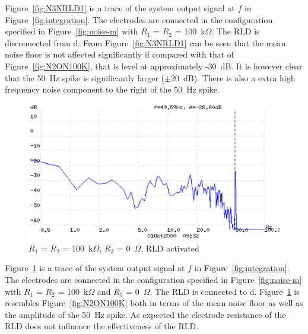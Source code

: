 Figure~\ref{fig:N3NRLD1} is a trace of the system output signal at $f$
in Figure~\ref{fig:integration}. The electrodes are connected in the
configuration specified in Figure~\ref{fig:noise-m} with $R_1$ = $R_2$
= 100~k$\Omega$. The RLD is disconnected from d. From
Figure~\ref{fig:N3NRLD1} can be seen that the mean noise floor is not
affected significantly if compared with that of
Figure~\ref{fig:N2ON100K}, that is level at approximately -30~dB. It
is however clear that the 50~Hz spike is significantly larger
($\pm$20~dB). There is also a extra high frequency noise component to
the right of the 50~Hz spike.


\begin{figure}[htbp]
\begin{center}
	\includegraphics[width=\textwidth]{N4RLD1.ps}
    \caption{$R_1$ = $R_2$ = 100~k$\Omega$, $R_3$ = 0~$\Omega$, RLD activated}
    \label{fig:N4RLD1}
\end{center}
\end{figure}

Figure~\ref{fig:N4RLD1} is a trace of the system output signal at $f$
in Figure~\ref{fig:integration}. The electrodes are connected in the
configuration specified in Figure~\ref{fig:noise-m} with $R_1$ = $R_2$
= 100~k$\Omega$ and $R_3$ = 0~$\Omega$. The RLD is connected to
d. Figure~\ref{fig:N4RLD1} is resembles Figure~\ref{fig:N2ON100K} both
in terms of the mean noise floor as well as the amplitude of the 50~Hz
spike. As expected the electrode resistance of the RLD does not
influence the effectiveness of the RLD. 


